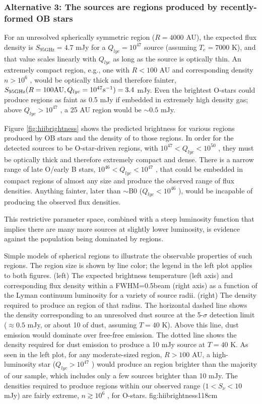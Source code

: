 \documentclass{emulateapj}
\begin{document}
\subsubsection{Alternative 3: The sources are \hii regions produced by recently-formed OB stars}
\label{sec:theyarehiiregions}

For an unresolved spherically symmetric \hii region ($R=4000$ AU), the expected flux density
is $S_{95 \mathrm{GHz}} = 4.7$ mJy for a $Q_{lyc}=10^{47}$ \pers source
(assuming $T_e=7000$ K), and that value scales linearly with $Q_{lyc}$ as long
as the source is optically thin.  An extremely compact \hii region, e.g., one
with $R<100$ AU and corresponding density $n>10^6$ \percc, would be optically
thick and therefore fainter, $S_{95 \mathrm{GHz}}(R=100 \mathrm{AU},
Q_{lyc}=10^{47} \mathrm{s}^{-1})=3.4$ mJy.  Even the brightest O-stars could produce \hii
regions as faint as 0.5 mJy if embedded in extremely high density gas; above
$Q_{lyc}>10^{47}$ \pers, a 25 AU \hii region would be $\sim0.5$ mJy.

Figure \ref{fig:hiibrightness} shows the predicted brightness for various \hii
regions produced by OB stars and the density of to those \hii regions.  In
order for the detected sources to be O-star-driven \hii regions, with $10^{47}
< Q_{lyc} < 10^{50}$ \pers, they must be optically thick and therefore
extremely compact and dense.  There is a narrow range of late O/early B stars,
$10^{46} < Q_{lyc} < 10^{47}$ \pers, that could be embedded in compact \hii
regions of almost any size and produce the observed range of flux densities.
Anything fainter, later than $\sim$B0 ($Q_{lyc}<10^{46}$ \pers), would be
incapable of producing the observed flux densities.

This restrictive parameter space, combined with a steep luminosity
function that implies there are many more sources at slightly lower luminosity,
is evidence against the population being dominated by \hii regions.

{Simple models of spherical \hii regions to illustrate the observable
properties of such regions.  The \hii region size is shown by line color; the legend
in the left plot applies to both figures.  (left) The expected brightness temperature (left
axis) and corresponding flux density within a FWHM=0.5\arcsec beam (right axis) as a
function of the Lyman continuum luminosity for a variety of source radii.
(right) The density required to produce an \hii region of that radius.  The
horizontal dashed line shows the density corresponding to an unresolved dust
source at the 5-$\sigma$ detection limit ($\approx0.5$ mJy, or about 10 \msun
of dust,
assuming $T=40$ K).  Above this line, dust emission would dominate over
free-free emission.  The dotted line shows the density required for dust
emission to produce a 10 mJy source at $T=40$ K.  
As seen in the left plot, for any moderate-sized \hii region, $R>100$ AU, a high-luminosity
star ($Q_{lyc} > 10^{47}$ \pers) would produce an \hii region brighter than the
majority of our sample, which includes only a few sources brighter than 10 mJy.
The densities required to produce \hii regions within our observed range
($1<S_\nu<10$ mJy) are fairly extreme, $n\gtrsim10^6$ \percc, for O-stars.}
{fig:hiibrightness}{1}{18cm}
\end{document}
